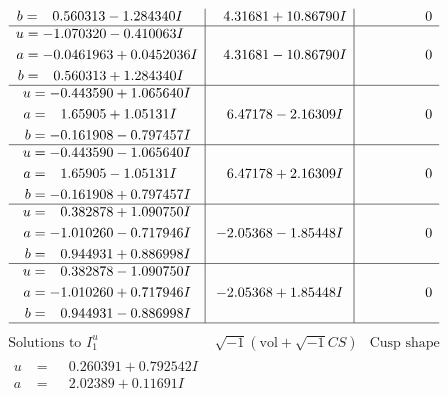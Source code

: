 \documentclass[1p]{elsarticle_modified}
\theoremstyle{definition}
\newcommand{\I}{\sqrt{-1}}
\begin{document}
$$\begin{array}{c|c|c}
\begin{aligned}
b &= \phantom{-}0.560313 - 1.284340 I\end{aligned}
 & \phantom{-}4.31681 + 10.86790 I & \phantom{-0.000000 } 0 \\ \hline\begin{aligned}
u &= -1.070320 - 0.410063 I \\
a &= -0.0461963 + 0.0452036 I \\
b &= \phantom{-}0.560313 + 1.284340 I\end{aligned}
 & \phantom{-}4.31681 - 10.86790 I & \phantom{-0.000000 } 0 \\ \hline\begin{aligned}
u &= -0.443590 + 1.065640 I \\
a &= \phantom{-}1.65905 + 1.05131 I \\
b &= -0.161908 - 0.797457 I\end{aligned}
 & \phantom{-}6.47178 - 2.16309 I & \phantom{-0.000000 } 0 \\ \hline\begin{aligned}
u &= -0.443590 - 1.065640 I \\
a &= \phantom{-}1.65905 - 1.05131 I \\
b &= -0.161908 + 0.797457 I\end{aligned}
 & \phantom{-}6.47178 + 2.16309 I & \phantom{-0.000000 } 0 \\ \hline\begin{aligned}
u &= \phantom{-}0.382878 + 1.090750 I \\
a &= -1.010260 - 0.717946 I \\
b &= \phantom{-}0.944931 + 0.886998 I\end{aligned}
 & -2.05368 - 1.85448 I & \phantom{-0.000000 } 0 \\ \hline\begin{aligned}
u &= \phantom{-}0.382878 - 1.090750 I \\
a &= -1.010260 + 0.717946 I \\
b &= \phantom{-}0.944931 - 0.886998 I\end{aligned}
 & -2.05368 + 1.85448 I & \phantom{-0.000000 } 0\\
 \hline 
 \end{array}$$\newpage$$\begin{array}{c|c|c}  
\text{Solutions to }I^u_{1}& \I (\text{vol} + \sqrt{-1}CS) & \text{Cusp shape}\\
 \hline 
\begin{aligned}
u &= \phantom{-}0.260391 + 0.792542 I \\
a &= \phantom{-}2.02389 + 0.11691 I \\

\end{aligned}
\end{array}$$
\end{document}
